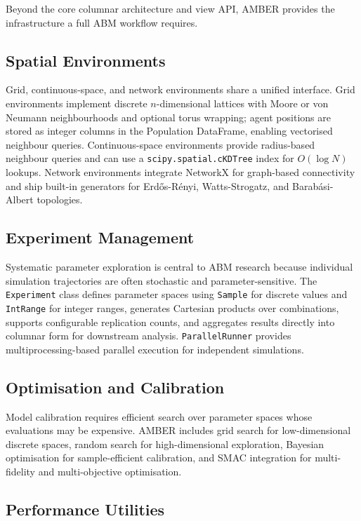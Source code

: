 \documentclass[11pt,a4paper]{article}
\begin{document}
Beyond the core columnar architecture and view API, AMBER provides the infrastructure a full ABM workflow requires.

\subsection{Spatial Environments}

Grid, continuous-space, and network environments share a unified interface. Grid environments implement discrete $n$-dimensional lattices with Moore or von Neumann neighbourhoods and optional torus wrapping; agent positions are stored as integer columns in the Population DataFrame, enabling vectorised neighbour queries. Continuous-space environments provide radius-based neighbour queries and can use a \texttt{scipy.spatial.cKDTree} index for $O(\log N)$ lookups. Network environments integrate NetworkX for graph-based connectivity and ship built-in generators for Erd\H{o}s-R\'{e}nyi, Watts-Strogatz, and Barab\'{a}si-Albert topologies.

\subsection{Experiment Management}

Systematic parameter exploration is central to ABM research because individual simulation trajectories are often stochastic and parameter-sensitive. The \texttt{Experiment} class defines parameter spaces using \texttt{Sample} for discrete values and \texttt{IntRange} for integer ranges, generates Cartesian products over combinations, supports configurable replication counts, and aggregates results directly into columnar form for downstream analysis. \texttt{ParallelRunner} provides multiprocessing-based parallel execution for independent simulations.

\subsection{Optimisation and Calibration}

Model calibration requires efficient search over parameter spaces whose evaluations may be expensive. AMBER includes grid search for low-dimensional discrete spaces, random search for high-dimensional exploration, Bayesian optimisation for sample-efficient calibration, and SMAC integration for multi-fidelity and multi-objective optimisation.

\subsection{Performance Utilities}
\end{document}
